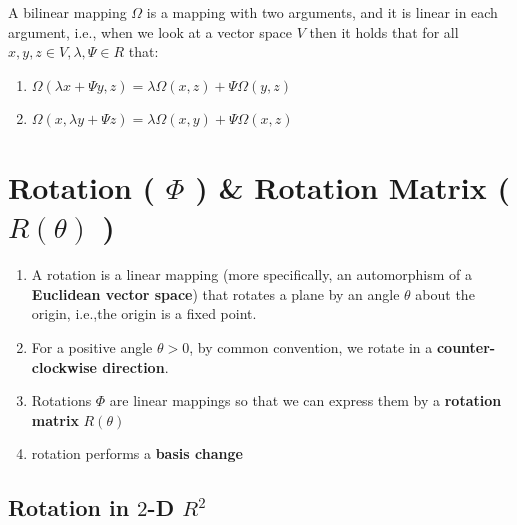 \vspace{0.2cm}
A bilinear mapping $\Omega $ is a mapping with two arguments, and it is linear in each argument, i.e., when we look at a vector space $V$ then it holds that for all $x, y, z \in V, \lambda , \Psi \in R$ that:
\begin{enumerate}
    \item $\Omega (\lambda x + \Psi y, z) = \lambda \Omega (x, z) + \Psi\Omega (y, z)$
    \item $\Omega (x, \lambda y + \Psi z) = \lambda \Omega (x, y) + \Psi\Omega (x, z)$
\end{enumerate}



\section{Rotation ( $\Phi$ ) \& Rotation Matrix ($R(\theta )$ ) \cite{mfml-1}}\label{Rotation and Rotation Matrix}

\begin{enumerate}
    \item A rotation is a linear mapping (more specifically, an automorphism of a \textbf{Euclidean vector space}) that rotates a plane by an angle $\theta$  about the origin, i.e.,the origin is a fixed point. 

    \item For a positive angle $\theta  > 0$, by common convention, we rotate in a \textbf{counter-clockwise direction}.

    \item Rotations $\Phi$  are linear mappings so that we can express them by a \textbf{rotation matrix} $R(\theta )$

    \item rotation performs a \textbf{basis change}
\end{enumerate}

\subsection{Rotation in $2$-D $R^2$ \cite{mfml-1}}\label{Rotation in 2-D}

